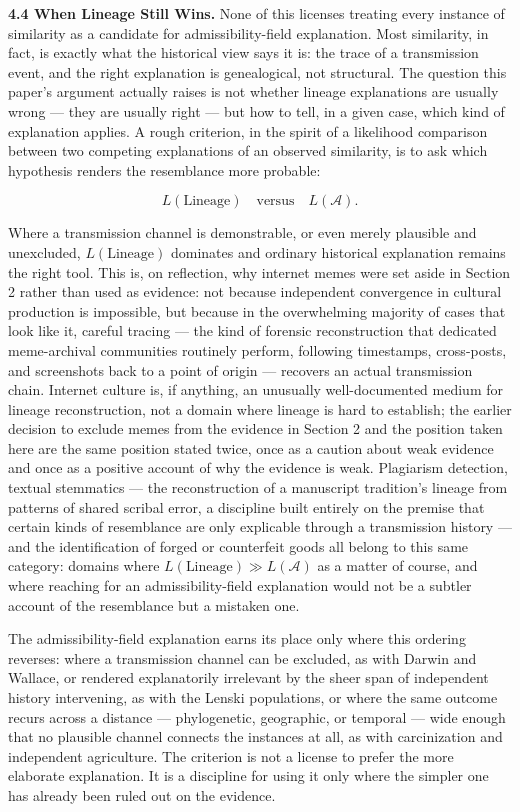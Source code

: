 \documentclass[11pt]{article}
\theoremstyle{plain}
\begin{document}
\textbf{4.4 When Lineage Still Wins.} None of this licenses treating every instance of similarity as a candidate for admissibility-field explanation. Most similarity, in fact, is exactly what the historical view says it is: the trace of a transmission event, and the right explanation is genealogical, not structural. The question this paper's argument actually raises is not whether lineage explanations are usually wrong --- they are usually right --- but how to tell, in a given case, which kind of explanation applies. A rough criterion, in the spirit of a likelihood comparison between two competing explanations of an observed similarity, is to ask which hypothesis renders the resemblance more probable:

\[
L(\text{Lineage}) \quad \text{versus} \quad L(\mathcal{A}).
\]

Where a transmission channel is demonstrable, or even merely plausible and unexcluded, \(L(\text{Lineage})\) dominates and ordinary historical explanation remains the right tool. This is, on reflection, why internet memes were set aside in Section 2 rather than used as evidence: not because independent convergence in cultural production is impossible, but because in the overwhelming majority of cases that look like it, careful tracing --- the kind of forensic reconstruction that dedicated meme-archival communities routinely perform, following timestamps, cross-posts, and screenshots back to a point of origin --- recovers an actual transmission chain. Internet culture is, if anything, an unusually well-documented medium for lineage reconstruction, not a domain where lineage is hard to establish; the earlier decision to exclude memes from the evidence in Section 2 and the position taken here are the same position stated twice, once as a caution about weak evidence and once as a positive account of why the evidence is weak. Plagiarism detection, textual stemmatics --- the reconstruction of a manuscript tradition's lineage from patterns of shared scribal error, a discipline built entirely on the premise that certain kinds of resemblance are only explicable through a transmission history --- and the identification of forged or counterfeit goods all belong to this same category: domains where \(L(\text{Lineage}) \gg L(\mathcal{A})\) as a matter of course, and where reaching for an admissibility-field explanation would not be a subtler account of the resemblance but a mistaken one.

The admissibility-field explanation earns its place only where this ordering reverses: where a transmission channel can be excluded, as with Darwin and Wallace, or rendered explanatorily irrelevant by the sheer span of independent history intervening, as with the Lenski populations, or where the same outcome recurs across a distance --- phylogenetic, geographic, or temporal --- wide enough that no plausible channel connects the instances at all, as with carcinization and independent agriculture. The criterion is not a license to prefer the more elaborate explanation. It is a discipline for using it only where the simpler one has already been ruled out on the evidence.
\end{document}
